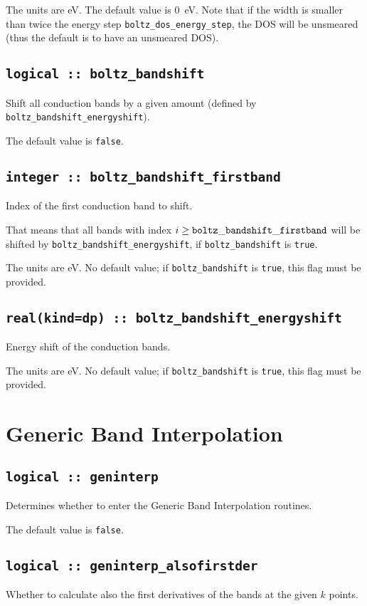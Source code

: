 The units are eV.
The default value is 0~eV. Note that if the width is smaller than twice the energy step {\tt boltz\_dos\_energy\_step}, the DOS will be unsmeared (thus the default is to have an unsmeared DOS).


\subsection[boltz\_bandshift]{\tt logical :: boltz\_bandshift}
Shift all conduction bands by a given amount (defined by {\tt boltz\_bandshift\_energyshift}).

The default value is \verb#false#.

\subsection[boltz\_bandshift\_firstband]{\tt integer :: boltz\_bandshift\_firstband}
Index of the first conduction band to shift.

That means that all bands with index $i\ge {\tt boltz\_bandshift\_firstband}$ will be shifted by  {\tt boltz\_bandshift\_energyshift}, if {\tt boltz\_bandshift} is \verb#true#.

The units are eV.
No default value; if {\tt boltz\_bandshift} is \verb#true#, this flag must be provided.

\subsection[boltz\_bandshift\_energyshift]{\tt real(kind=dp) :: boltz\_bandshift\_energyshift}
Energy shift of the conduction bands.

The units are eV.
No default value; if {\tt boltz\_bandshift} is \verb#true#, this flag must be provided.


\section{Generic Band Interpolation}
\subsection[boltzwann]{\tt logical :: geninterp}
Determines whether to enter the Generic Band Interpolation routines.

The default value is \verb#false#.

\subsection[geninterp\_alsofirstder]{\tt logical :: geninterp\_alsofirstder}
Whether to calculate also the first derivatives of the bands at the
given $k$ points.


